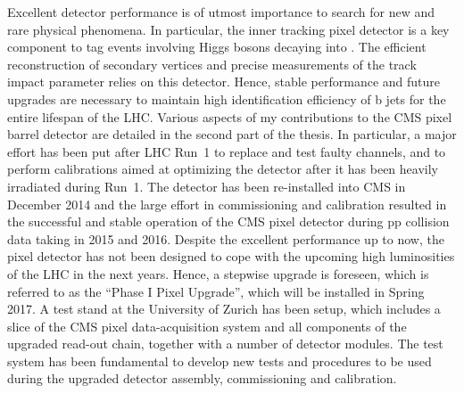 \noindent Excellent detector performance is of utmost importance to search for new and rare physical phenomena.
In particular, the inner tracking pixel detector is a key component to tag events involving Higgs bosons decaying into \bbbar.
The efficient reconstruction of secondary vertices and precise measurements of the track impact parameter relies on this detector.
Hence, stable performance and future upgrades are necessary to maintain high identification efficiency of b jets for the entire lifespan of the LHC.
Various aspects of my contributions to the CMS pixel barrel detector are detailed in the second part of the thesis.
In particular, a major effort has been put after LHC Run~1 to replace and test faulty channels,
and to perform calibrations aimed at optimizing the detector after it has been heavily irradiated during Run~1.
The detector has been re-installed into CMS in December 2014 and the large effort in commissioning and calibration 
resulted in the successful and stable operation of the CMS pixel detector during pp collision data taking in 2015 and 2016.
Despite the excellent performance up to now, the pixel detector has not been designed to cope with the upcoming high luminosities of the LHC in the next years.
Hence, a stepwise upgrade is foreseen, which is referred to as the ``Phase I Pixel Upgrade'', which will be installed in Spring 2017.
A test stand at the University of Zurich has been setup, which includes a slice of the CMS pixel data-acquisition system and all components of the upgraded read-out chain, together with a number of detector modules.
The test system has been fundamental to develop new tests and procedures to be used during the upgraded detector assembly, commissioning and calibration.

\vspace*{\fill}
